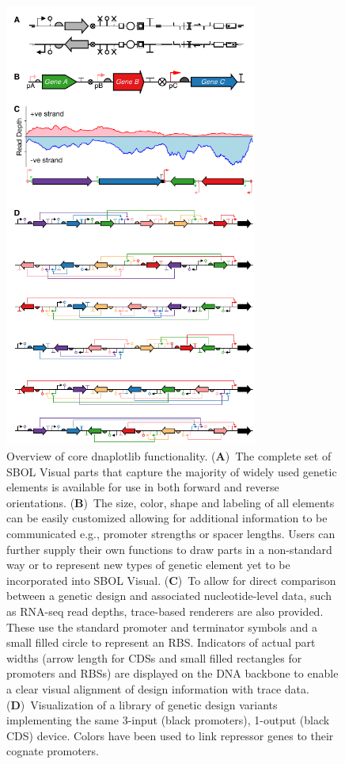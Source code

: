 \documentclass{bioinfo}
\begin{document}
\begin{figure}[t]
\centering
\includegraphics[width=8.3cm]{Figure1.pdf}
\caption{\label{fig:overview}Overview of core dnaplotlib functionality. (\textbf{A})~The complete set of SBOL Visual parts that capture the majority of widely used genetic elements is available for use in both forward and reverse orientations. (\textbf{B})~The size, color, shape and labeling of all elements can be easily customized allowing for additional information to be communicated e.g., promoter strengths or spacer lengths. Users can further supply their own functions to draw parts in a non-standard way or to represent new types of genetic element yet to be incorporated into SBOL Visual. (\textbf{C})~To allow for direct comparison between a genetic design and associated nucleotide-level data, such as RNA-seq read depths, trace-based renderers are also provided. These use the standard promoter and terminator symbols and a small filled circle to represent an RBS. Indicators of actual part widths (arrow length for CDSs and small filled rectangles for promoters and RBSs) are displayed on the DNA backbone to enable a clear visual alignment of design information with trace data. (\textbf{D})~Visualization of a library of genetic design variants implementing the same 3-input (black promoters), 1-output (black CDS) device. Colors have been used to link repressor genes to their cognate promoters.}
\end{figure}
\end{document}
